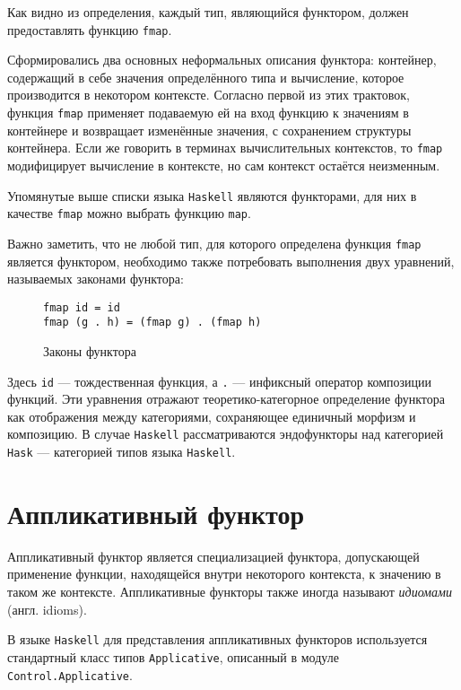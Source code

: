 Как видно из определения, каждый тип, являющийся функтором, должен предоставлять
функцию \lstinline{fmap}.

Сформировались два основных неформальных описания функтора: контейнер,
содержащий в себе значения определённого типа и вычисление, которое производится
в некотором контексте. Согласно первой из этих трактовок, функция
\lstinline{fmap} применяет подаваемую ей на вход функцию к значениям в
контейнере и возвращает изменённые значения, с сохранением структуры контейнера.
Если же говорить в терминах вычислительных контекстов, то \lstinline{fmap}
модифицирует вычисление в контексте, но сам контекст остаётся неизменным.

Упомянутые выше списки языка \lstinline{Haskell} являются функторами, для них в
качестве \lstinline{fmap} можно выбрать функцию \lstinline{map}.

Важно заметить, что не любой тип, для которого определена функция
\lstinline{fmap} является функтором, необходимо также потребовать выполнения
двух уравнений, называемых законами функтора:

\begin{figure}[h]
\begin{lstlisting}
fmap id = id
fmap (g . h) = (fmap g) . (fmap h)
\end{lstlisting}
\caption{Законы функтора}
\label{listing:FunctorLaws}
\end{figure}

Здесь \lstinline{id} --- тождественная функция, а \lstinline{.} --- инфиксный
оператор композиции функций. Эти уравнения отражают теоретико-категорное
определение функтора как отображения между категориями, сохраняющее единичный
морфизм и композицию. В случае \lstinline{Haskell} рассматриваются эндофункторы
над категорией \lstinline{Hask} --- категорией типов языка \lstinline{Haskell}.

\section{Аппликативный функтор}

Аппликативный функтор является специализацией функтора, допускающей применение
функции, находящейся внутри некоторого контекста, к значению в таком же
контексте. Аппликативные функторы также иногда называют \emph{идиомами}
(англ. idioms).

В языке \lstinline{Haskell} для представления аппликативных функторов
используется стандартный класс типов \lstinline{Applicative},
описанный в модуле \lstinline{Control.Applicative}.

